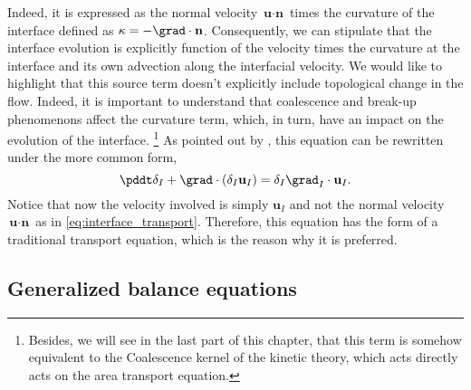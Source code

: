 Indeed, it is expressed as the normal velocity $\textbf{u}\cdot\textbf{n}$ times the curvature of the interface defined as $\kappa = - \grad \cdot \textbf{n}$.
Consequently, we can stipulate that the interface evolution is explicitly function of the velocity times the curvature at the interface and its own advection along the interfacial velocity. 
We would like to highlight that this source term doesn't explicitly include topological change in the flow. 
Indeed, it is important to understand that coalescence and break-up phenomenons affect the curvature term, which, in turn, have an impact on the evolution of the interface. 
\footnote{Besides, we will see in the last part of this chapter, that this term is somehow equivalent to the Coalescence kernel of the kinetic theory, which acts directly acts on the area transport equation.} 
As pointed out by \citet{morel2007surface}, this equation can be rewritten under the more common form,
\begin{equation}
    \pddt \delta_I
    + \grad \cdot (\delta_I \textbf{u}_I)
    = \delta_I \grad_I \cdot \textbf{u}_I.
    \label{eq:interface_transport2}
\end{equation}
Notice that now the velocity involved is simply $\textbf{u}_I$ and not the normal velocity $\textbf{u} \cdot \textbf{n}$ as in \ref{eq:interface_transport}.
Therefore, this equation has the form of a traditional transport equation, which is the reason why it is preferred. 

\subsection{Generalized balance equations}

